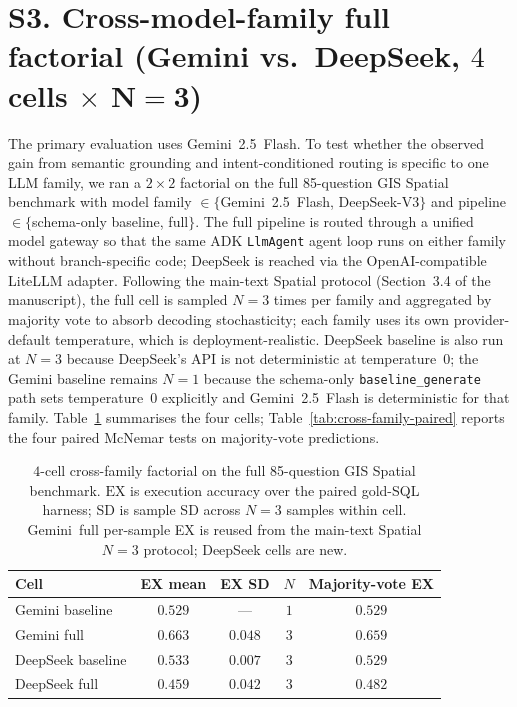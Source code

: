 \documentclass[11pt]{article}
\begin{document}
\section*{S3. Cross-model-family full factorial (Gemini vs.\ DeepSeek, $4$ cells $\times$ N$=$3)}

The primary evaluation uses Gemini~2.5~Flash. To test whether the observed gain
from semantic grounding and intent-conditioned routing is specific to one LLM
family, we ran a $2{\times}2$ factorial on the full 85-question GIS Spatial
benchmark with model family $\in\{$Gemini~2.5~Flash, DeepSeek-V3$\}$ and
pipeline $\in\{$schema-only baseline, full$\}$. The full pipeline is routed
through a unified model gateway so that the same ADK \texttt{LlmAgent} agent
loop runs on either family without branch-specific code; DeepSeek is reached
via the OpenAI-compatible LiteLLM adapter. Following the main-text Spatial
protocol (Section~3.4 of the manuscript), the full cell is sampled $N{=}3$
times per family and aggregated by majority vote to absorb decoding
stochasticity; each family uses its own provider-default temperature, which
is deployment-realistic. DeepSeek baseline is also run at $N{=}3$ because
DeepSeek's API is not deterministic at temperature~$0$; the Gemini baseline
remains $N{=}1$ because the schema-only \texttt{baseline\_generate} path sets
temperature~$0$ explicitly and Gemini~2.5~Flash is deterministic for that
family. Table~\ref{tab:cross-family-4cell} summarises the four cells;
Table~\ref{tab:cross-family-paired} reports the four paired McNemar tests on
majority-vote predictions.

\begin{table}[h]
\centering
\caption{$4$-cell cross-family factorial on the full 85-question GIS Spatial
benchmark. $\mathrm{EX}$ is execution accuracy over the paired gold-SQL
harness; SD is sample SD across $N=3$ samples within cell. Gemini~full
per-sample EX is reused from the main-text Spatial $N=3$ protocol;
DeepSeek cells are new.}
\label{tab:cross-family-4cell}
\begin{tabular}{lcccc}
\toprule
Cell & EX mean & EX SD & $N$ & Majority-vote EX \\
\midrule
Gemini baseline   & $0.529$ & ---      & $1$ & $0.529$ \\
Gemini full       & $0.663$ & $0.048$  & $3$ & $0.659$ \\
DeepSeek baseline & $0.533$ & $0.007$  & $3$ & $0.529$ \\
DeepSeek full     & $0.459$ & $0.042$  & $3$ & $0.482$ \\
\bottomrule
\end{tabular}
\end{table}
\end{document}
